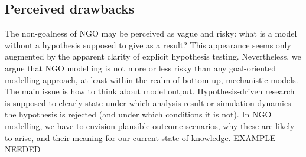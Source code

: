 \subsection{Perceived drawbacks}

The non-goalness of NGO may be perceived as vague and risky: what is a model without a hypothesis supposed to give as a result? This appearance seems only augmented by the apparent clarity of explicit hypothesis testing. Nevertheless, we argue that NGO modelling is not more or less risky than any goal-oriented modelling approach, at least within the realm of bottom-up, mechanistic models. The main issue is how to think about model output. Hypothesis-driven research is supposed to clearly state under which analysis result or simulation dynamics the hypothesis is rejected (and under which conditions it is not). In NGO modelling, we have to envision plausible outcome scenarios, why these are likely to arise, and their meaning for our current state of knowledge. EXAMPLE NEEDED
